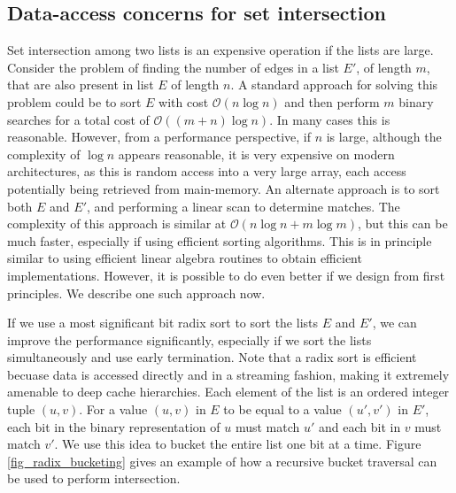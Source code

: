 \subsection{Data-access concerns for set intersection}
Set intersection among two lists is an expensive operation if the lists are large. Consider the problem of finding the number of edges in a list $E'$, of length $m$,  that are also present in list $E$ of length $n$. A standard approach for solving this problem could be to sort $E$ with cost $\mathcal{O}(n\log n)$ and then perform $m$ binary searches for a total cost of $\mathcal{O}((m+n)\log n)$. In many cases this is reasonable. However, from a performance perspective, if $n$ is large, although the complexity of $\log n$ appears reasonable, it is very expensive on modern architectures, as this is random access into a very large array, each access potentially being retrieved from main-memory. An alternate approach is to sort both $E$ and $E'$, and performing a linear scan to determine matches. The complexity of this approach is similar at $\mathcal{O}(n\log n + m\log m)$, but this can be much faster, especially if using efficient sorting algorithms. This is in principle similar to using efficient linear algebra routines to obtain efficient implementations. However, it is possible to do even better if we design from first principles. We describe one such approach now.  

If we use a most significant bit radix sort to sort the lists $E$ and $E'$, we can improve the performance significantly, especially if we sort the lists simultaneously and use early termination. Note that a radix sort is efficient becuase data is accessed directly and in a streaming fashion, making it extremely amenable to deep cache hierarchies.   
Each element of the list is an ordered integer tuple $(u,v)$. For a value $(u,v)$ in $E$ to be equal to a value $(u',v')$ in $E'$, each bit in the binary representation of $u$ must match $u'$ and each bit in $v$ must match $v'$. We use this idea to bucket the entire list one bit at a time. Figure \ref{fig_radix_bucketing} gives an example of how a recursive bucket traversal can be used to perform intersection.


